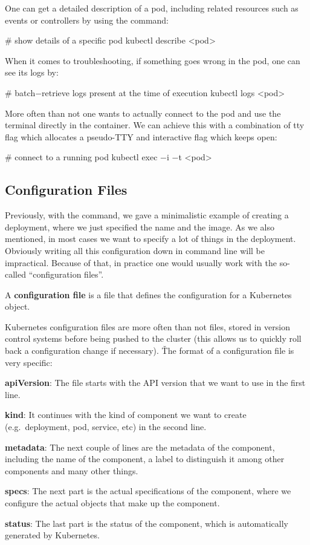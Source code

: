 One can get a detailed description of a pod, including related resources such as events or controllers by using the
 command:
\begin{bash}
# show details of a specific pod
kubectl describe <pod>
\end{bash}

When it comes to troubleshooting, if something goes wrong in the pod, one can see its logs by:
\begin{bash}
# batch$-$retrieve logs present at the time of execution
kubectl logs <pod>
\end{bash}

More often than not one wants to actually connect to the pod and use the terminal directly in the container. We can
achieve this with a combination of tty  flag which allocates a pseudo-TTY and interactive  flag which
keeps  open:
\begin{bash}
# connect to a running pod
kubectl exec $-$i $-$t <pod>
\end{bash}

\subsection{Configuration Files}

Previously, with the  command, we gave a minimalistic example of creating a deployment,
where we just specified the name and the image. As we also mentioned, in most cases we want to specify a lot of things
in the deployment. Obviously writing all this configuration down in command line will be impractical. Because of that,
in practice one would usually work with the so-called ``configuration files''.

A \textbf{configuration file} is a file that defines the configuration for a Kubernetes object.
\ed

Kubernetes configuration files are more often than not  files, stored in version control systems before
being pushed to the cluster (this allows us to quickly roll back a configuration change if necessary). \v

The format of a configuration file is very specific:
\bit
\item \textbf{apiVersion}: The file starts with the API version that we want to use in the first line.
\item \textbf{kind}: It continues with the kind of component we want to create (e.g.\ deployment, pod, service, etc) in
the second line.
\item \textbf{metadata}: The next couple of lines are the metadata of the component, including the name of the
component, a label to distinguish it among other components and many other things.
\item \textbf{specs}: The next part is the actual specifications of the component, where we configure the actual objects
that make up the component.
\item \textbf{status}: The last part is the status of the component, which is automatically generated by Kubernetes.
\eit

